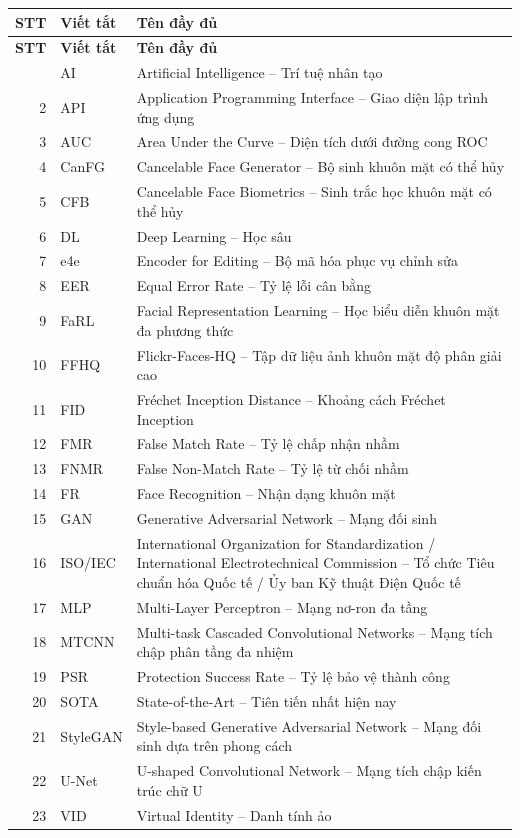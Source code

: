 \documentclass[oneside,a4paper,12pt]{extarticle}
\begin{document}
{\small
\renewcommand{\theHtable}{glossary.abbr.\arabic{table}}
\begin{longtable}{r l >{\raggedright\arraybackslash}p{10.6cm}}
\toprule
\textbf{STT} & \textbf{Viết tắt} & \textbf{Tên đầy đủ} \\
\midrule
\endfirsthead
\toprule
\textbf{STT} & \textbf{Viết tắt} & \textbf{Tên đầy đủ} \\
\midrule
\endhead
\bottomrule
\endfoot
1 & AI & Artificial Intelligence -- Trí tuệ nhân tạo \\
2 & API & Application Programming Interface -- Giao diện lập trình ứng dụng \\
3 & AUC & Area Under the Curve -- Diện tích dưới đường cong ROC \\
4 & CanFG & Cancelable Face Generator -- Bộ sinh khuôn mặt có thể hủy \\
5 & CFB & Cancelable Face Biometrics -- Sinh trắc học khuôn mặt có thể hủy \\
6 & DL & Deep Learning -- Học sâu \\
7 & e4e & Encoder for Editing -- Bộ mã hóa phục vụ chỉnh sửa \\
8 & EER & Equal Error Rate -- Tỷ lệ lỗi cân bằng \\
9 & FaRL & Facial Representation Learning -- Học biểu diễn khuôn mặt đa phương thức \\
10 & FFHQ & Flickr-Faces-HQ -- Tập dữ liệu ảnh khuôn mặt độ phân giải cao \\
11 & FID & Fréchet Inception Distance -- Khoảng cách Fréchet Inception \\
12 & FMR & False Match Rate -- Tỷ lệ chấp nhận nhầm \\
13 & FNMR & False Non-Match Rate -- Tỷ lệ từ chối nhầm \\
14 & FR & Face Recognition -- Nhận dạng khuôn mặt \\
15 & GAN & Generative Adversarial Network -- Mạng đối sinh \\
16 & ISO/IEC & International Organization for Standardization / International Electrotechnical Commission -- Tổ chức Tiêu chuẩn hóa Quốc tế / Ủy ban Kỹ thuật Điện Quốc tế \\
17 & MLP & Multi-Layer Perceptron -- Mạng nơ-ron đa tầng \\
18 & MTCNN & Multi-task Cascaded Convolutional Networks -- Mạng tích chập phân tầng đa nhiệm \\
19 & PSR & Protection Success Rate -- Tỷ lệ bảo vệ thành công \\
20 & SOTA & State-of-the-Art -- Tiên tiến nhất hiện nay \\
21 & StyleGAN & Style-based Generative Adversarial Network -- Mạng đối sinh dựa trên phong cách \\
22 & U-Net & U-shaped Convolutional Network -- Mạng tích chập kiến trúc chữ U \\
23 & VID & Virtual Identity -- Danh tính ảo \\
\end{longtable}
\addtocounter{table}{-1}
}
\end{document}
